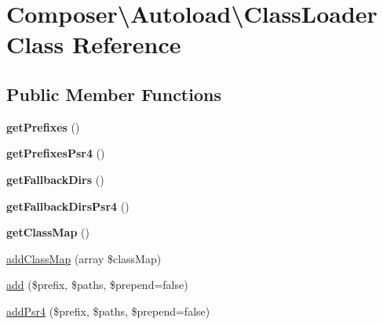 \hypertarget{classComposer_1_1Autoload_1_1ClassLoader}{}\section{Composer\textbackslash{}Autoload\textbackslash{}Class\+Loader Class Reference}
\label{classComposer_1_1Autoload_1_1ClassLoader}
\subsection*{Public Member Functions}
\begin{DoxyCompactItemize}
\item 
\mbox{\label{classComposer_1_1Autoload_1_1ClassLoader_af3d914a2e97ec1118f3d70e5a0ce6435}} 
{\bfseries get\+Prefixes} ()
\item 
\mbox{\label{classComposer_1_1Autoload_1_1ClassLoader_a36833139effe6653454d8f02ea8f555b}} 
{\bfseries get\+Prefixes\+Psr4} ()
\item 
\mbox{\label{classComposer_1_1Autoload_1_1ClassLoader_a9fe425ce19f8e1298cefbf5094b3c402}} 
{\bfseries get\+Fallback\+Dirs} ()
\item 
\mbox{\label{classComposer_1_1Autoload_1_1ClassLoader_a149bf4470ee7c50bd6b9a84b6aa4bccd}} 
{\bfseries get\+Fallback\+Dirs\+Psr4} ()
\item 
\mbox{\label{classComposer_1_1Autoload_1_1ClassLoader_aa7d3012e1f8299ecc6c3ff3cb3f2652e}} 
{\bfseries get\+Class\+Map} ()
\item 
\hyperlink{classComposer_1_1Autoload_1_1ClassLoader_a246d6f628e6ae99bf0ce65b0212f833a}{add\+Class\+Map} (array \$class\+Map)
\item 
\hyperlink{classComposer_1_1Autoload_1_1ClassLoader_aa99f46d61bdf20b924a1bb08bfcb90bd}{add} (\$prefix, \$paths, \$prepend=false)
\item 
\hyperlink{classComposer_1_1Autoload_1_1ClassLoader_a8831c0a7bb01fa44b4cb7a72ec111cf1}{add\+Psr4} (\$prefix, \$paths, \$prepend=false)
\item 

\end{DoxyCompactItemize}
